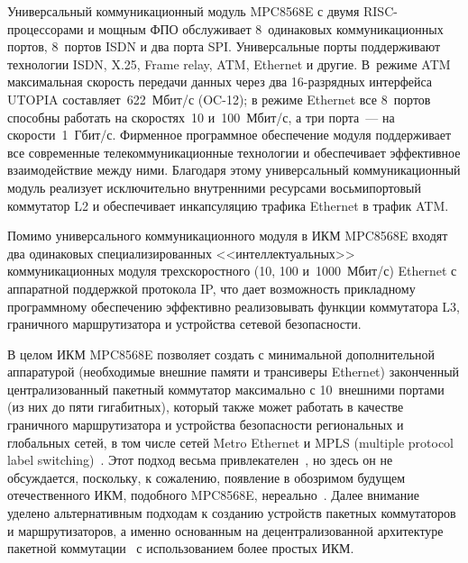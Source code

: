 \begin{multicols}{2}
     Универсальный коммуникационный модуль MPC8568E с двумя RISC-про\-цес\-со\-ра\-ми и 
мощным ФПО обслуживает 8~одинаковых коммуникационных портов, 8~портов ISDN и два 
порта SPI. Универсальные порты поддерживают технологии ISDN, X.25, Frame relay, ATM, 
Ethernet и другие. В~режиме ATM максимальная скорость передачи данных через два 
16-раз\-ряд\-ных интерфейса UTOPIA составляет~622~Мбит/с (OC-12); в режиме Ethernet все 
8~портов способны работать на скоростях~10 и~100~Мбит/с, а три порта~--- на ско\-рости~1~Гбит/с. 
Фирменное программное обеспечение модуля поддер\-жи\-ва\-ет все современные теле\-ком\-му\-ни\-ка\-ци\-он\-ные технологии 
и обеспечивает эффек\-тив\-ное взаимодействие между ними. Бла\-года\-ря этому универ\-саль\-ный 
коммуникационный модуль реализует исключительно внутренними ресурсами 
восьмипортовый коммутатор L2 и обеспечивает ин\-кап\-су\-ля\-цию трафика Ethernet в трафик 
ATM.
{

}
     
     Помимо универсального коммуникационного модуля в ИКМ MPC8568E входят два 
одинаковых специализированных <<интеллектуальных>> коммуникационных модуля 
трехскоростного (10, 100 %
 и~1000~Мбит/с) Ethernet с аппаратной поддержкой протокола IP, 
что дает возможность прикладному программному обеспечению эффективно %
реали\-зо\-вы\-вать 
функции коммутатора L3, граничного маршрутизатора и устройства сетевой безопас\-ности.
     
     В целом ИКМ MPC8568E позволяет создать с минимальной дополнительной 
аппаратурой (необходимые внешние памяти и трансиверы Ethernet) законченный 
централизованный пакетный коммутатор максимально с 10~внешними портами (из них до 
пяти гигабитных), который также может работать в качестве граничного маршрутизатора и 
устройства безопасности региональных и глобальных сетей, в том числе сетей Metro Ethernet 
и MPLS (multiple protocol label switching)~\cite{4e, 5e}. Этот подход весьма привлекателен~\cite{8e}, но здесь он не 
обсуждается, поскольку, к сожалению, появление в обозримом будущем отечественного 
ИКМ, подобного MPC8568E, нереально~\cite{7e}. Далее внимание уделено альтернативным 
подходам к созданию устройств пакетных коммутаторов и маршрутизаторов, а именно 
основанным на децентрализованной архитектуре пакетной коммутации~\cite{9e} с 
использованием более простых ИКМ.

\begin{figure*} %
\vspace*{1pt}
\begin{center}
\mbox{%
\epsfxsize=129.293mm
}
\end{center}
\vspace*{-9pt}
\end{figure*}
     

\end{multicols}
